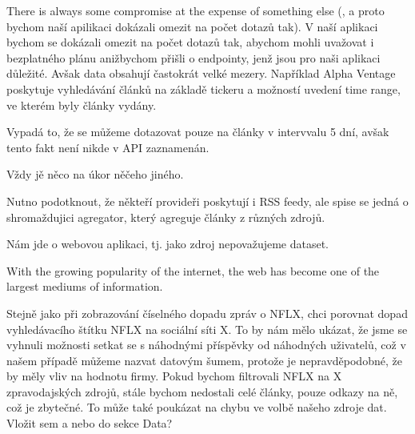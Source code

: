 There is always some compromise at the expense of something else (, a proto bychom naší apilikaci dokázali omezit na počet dotazů tak). V naší aplikaci bychom se dokázali omezit na počet dotazů tak, abychom mohli uvažovat i bezplatného plánu anižbychom přišli o endpointy, jenž jsou pro naši aplikaci důležité. Avšak data obsahují častokrát velké mezery. Například Alpha Ventage poskytuje vyhledávání článků na základě tickeru a možností uvedení time range, ve kterém byly články vydány.

Vypadá to, že se můžeme dotazovat pouze na články v intervvalu 5 dní, avšak tento fakt není nikde v API zaznamenán.

Vždy jě něco na úkor něčeho jiného. 

Nutno podotknout, že někteří provideři poskytují i RSS feedy, ale spise se jedná o shromaždujici agregator, který agreguje články z různých zdrojů.

Nám jde o webovou aplikaci, tj. jako zdroj nepovažujeme dataset.

With the growing popularity of the internet, the web has become one of the largest mediums of information.

Stejně jako při zobrazování číselného dopadu zpráv o NFLX, chci porovnat dopad vyhledávacího štítku NFLX na sociální síti X. To by nám mělo ukázat, že jsme se vyhnuli možnosti setkat se s náhodnými příspěvky od náhodných uživatelů, což v našem případě můžeme nazvat datovým šumem, protože je nepravděpodobné, že by měly vliv na hodnotu firmy. Pokud bychom filtrovali NFLX na X zpravodajských zdrojů, stále bychom nedostali celé články, pouze odkazy na ně, což je zbytečné. To může také poukázat na chybu ve volbě našeho zdroje dat. Vložit sem a nebo do sekce Data?